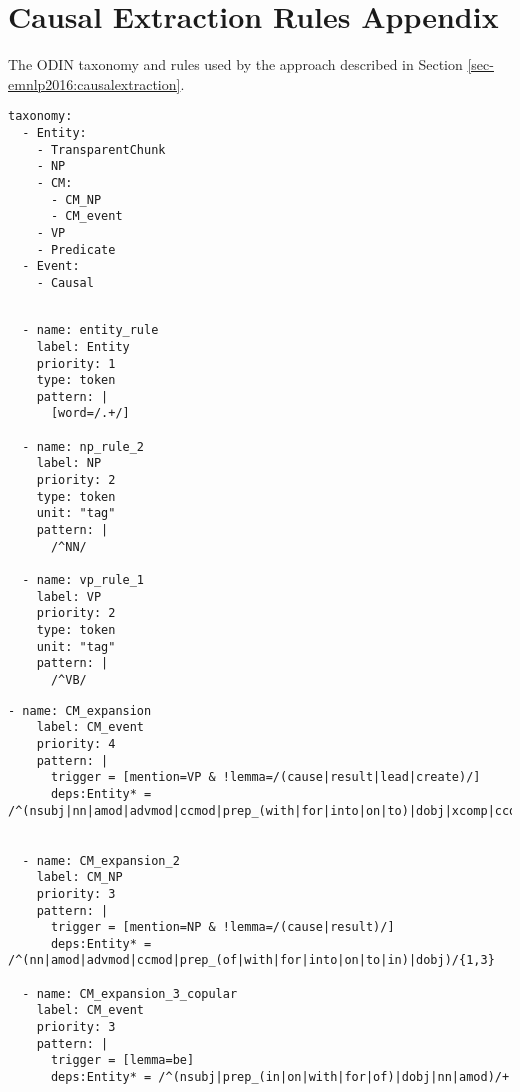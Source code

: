 \chapter{Causal Extraction Rules Appendix \label{appendix:rules}}

The ODIN \citep{valenzuela2016runes} taxonomy and rules used by the approach described in Section \ref{sec-emnlp2016:causalextraction}.  
\begin{singlespace}
\begin{lstlisting}[label = {lst:tax}, caption = {ODIN taxonomy which provides the hierarchy of extracted entities and events.}]
taxonomy:
  - Entity:
    - TransparentChunk
    - NP
    - CM:
      - CM_NP
      - CM_event
    - VP
    - Predicate
  - Event:
    - Causal
\end{lstlisting}

\begin{lstlisting}[label={lst:gramm_rules},
caption={Rules for grammatical primatives (e.g. noun phrases, prepositional phrases, etc).  These are used in a later step for finding the causal mentions.}]

  - name: entity_rule
    label: Entity
    priority: 1
    type: token
    pattern: |
      [word=/.+/]

  - name: np_rule_2
    label: NP
    priority: 2
    type: token
    unit: "tag"
    pattern: |
      /^NN/

  - name: vp_rule_1
    label: VP
    priority: 2
    type: token
    unit: "tag"
    pattern: |
      /^VB/
\end{lstlisting}

\begin{lstlisting}[caption={Rules for extracting causal mentions (CMs), which are the potential arguments for causal events.}]
  - name: CM_expansion
    label: CM_event
    priority: 4
    pattern: |
      trigger = [mention=VP & !lemma=/(cause|result|lead|create)/]
      deps:Entity* = /^(nsubj|nn|amod|advmod|ccmod|prep_(with|for|into|on|to)|dobj|xcomp|ccomp|agent|vmod)/{1,3}    


  - name: CM_expansion_2
    label: CM_NP
    priority: 3
    pattern: |
      trigger = [mention=NP & !lemma=/(cause|result)/]
      deps:Entity* = /^(nn|amod|advmod|ccmod|prep_(of|with|for|into|on|to|in)|dobj)/{1,3}   

  - name: CM_expansion_3_copular
    label: CM_event
    priority: 3
    pattern: |
      trigger = [lemma=be]
      deps:Entity* = /^(nsubj|prep_(in|on|with|for|of)|dobj|nn|amod)/+ 



\end{lstlisting}
\end{singlespace}
